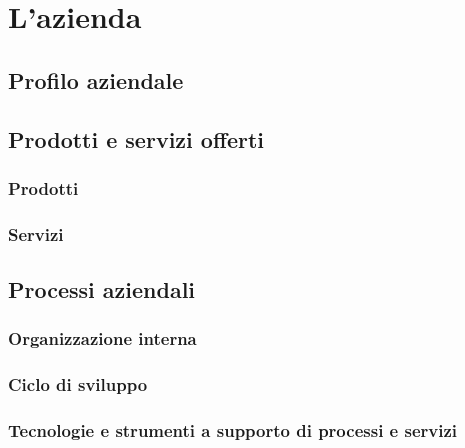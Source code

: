 
\chapter{L'azienda}
\section{Profilo aziendale}

\section{Prodotti e servizi offerti}
	
	\subsection{Prodotti}
	
	\subsection{Servizi}
	
\section{Processi aziendali}

	\subsection{Organizzazione interna}
	
	\subsection{Ciclo di sviluppo}
	
	\subsection{Tecnologie e strumenti a supporto di processi e servizi}

